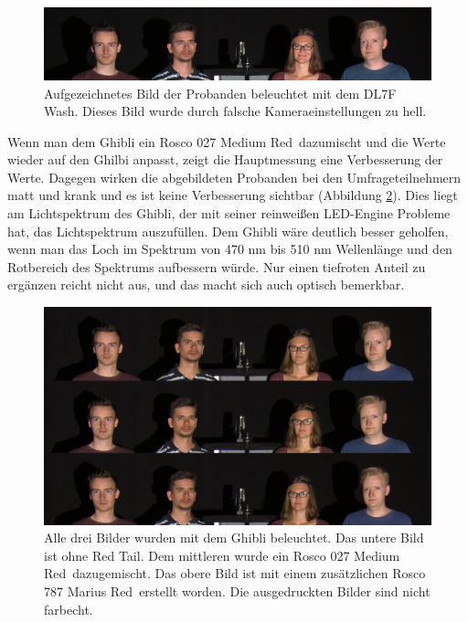 \begin{figure}[H]     %
\centering
\includegraphics[width=1.0\textwidth]{bilder/umfragedl7fkaputt} 
\caption {Aufgezeichnetes Bild der Probanden beleuchtet mit dem DL7F Wash. Dieses Bild wurde durch falsche Kameraeinstellungen zu hell.} \label{b_umfragedl7fkaputt}
\end{figure}

\newpage
\noindent Wenn man dem Ghibli ein Rosco 027 \glqq Medium Red\grqq\ dazumischt und die Werte wieder auf den Ghilbi anpasst, zeigt die Hauptmessung eine Verbesserung der Werte. Dagegen wirken die abgebildeten Probanden bei den Umfrageteilnehmern matt und krank und es ist keine Verbesserung sichtbar (Abbildung \ref{b_vergleich2}). Dies liegt am Lichtspektrum des Ghibli, der mit seiner reinweißen LED-Engine Probleme hat, das Lichtspektrum auszufüllen. Dem Ghibli wäre deutlich besser geholfen, wenn man das Loch im Spektrum von 470 nm bis 510 nm Wellenlänge und den Rotbereich des Spektrums aufbessern würde. Nur einen tiefroten Anteil zu ergänzen reicht nicht aus, und das macht sich auch optisch bemerkbar.\\

\begin{figure}[H]     %
\centering
\includegraphics[width=1.0\textwidth]{bilder/vergleich2} 
\caption {Alle drei Bilder wurden mit dem Ghibli beleuchtet. Das untere Bild ist ohne \glqq Red Tail\grqq . Dem mittleren wurde ein Rosco 027 \glqq Medium Red\grqq\ dazugemischt. Das obere Bild ist mit einem zusätzlichen Rosco 787 \glqq Marius Red\grqq\ erstellt worden. Die ausgedruckten Bilder sind nicht farbecht.} \label{b_vergleich2}
\end{figure}

